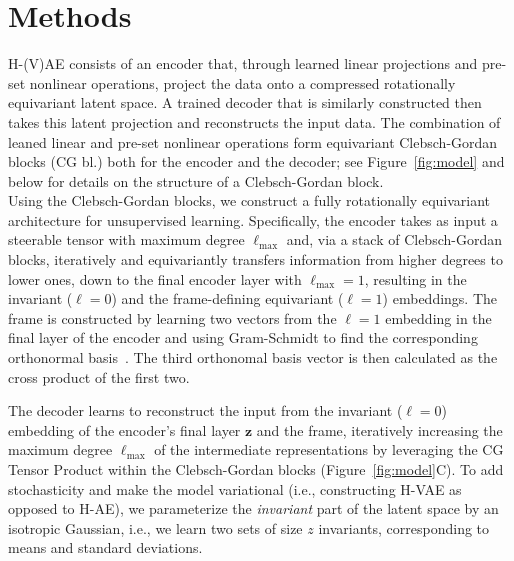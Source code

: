 \section{Methods}

  H-(V)AE consists of an encoder that, through
learned linear projections and pre-set nonlinear operations, project the data  onto a compressed
rotationally equivariant latent space. A trained decoder that is similarly constructed then takes
this latent projection and reconstructs the input data. The combination of leaned linear and
pre-set nonlinear operations form equivariant Clebsch-Gordan blocks (CG bl.) both for the encoder
and the decoder; see Figure~\ref{fig:model} and below for details on the structure of  a
Clebsch-Gordan block. \\

Using the Clebsch-Gordan blocks, we  construct a fully rotationally equivariant architecture for
unsupervised learning. Specifically, the encoder takes as input a steerable tensor with maximum
degree $\ell_\text{max}$ and, via a stack of Clebsch-Gordan blocks, iteratively and equivariantly
transfers information from higher degrees to lower ones, down to the final encoder layer with 
$\ell_\text{max} = 1$, resulting in the invariant ($\ell=0$) and the frame-defining equivariant
($\ell=1$) embeddings.  The frame is constructed by learning two vectors from the $\ell=1$
embedding in the final layer of the encoder and using Gram-Schmidt to find the corresponding
orthonormal basis~\cite{schmidt_zur_1907}. The third orthonomal basis vector is then calculated as
the cross product of the first two.


The decoder learns to reconstruct the input from the invariant ($\ell=0$) embedding of the
encoder's final layer $\mathbf{z}$ and the frame, iteratively increasing the maximum degree
$\ell_\text{max}$ of the intermediate representations by leveraging the CG Tensor Product within
the Clebsch-Gordan blocks (Figure~\ref{fig:model}C). To add stochasticity and make the model
variational (i.e., constructing H-VAE as opposed to H-AE), we parameterize the \textit{invariant}
part of the latent space by an isotropic Gaussian, i.e., we learn two sets of size $z$ invariants,
corresponding to means and standard deviations. \\


